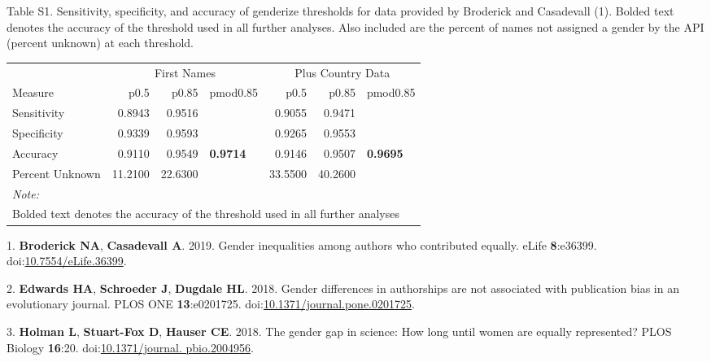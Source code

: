 \documentclass[11pt,]{article}
\begin{document}
\vspace{40mm}

Table S1. Sensitivity, specificity, and accuracy of genderize thresholds
for data provided by Broderick and Casadevall (1). Bolded text denotes
the accuracy of the threshold used in all further analyses. Also
included are the percent of names not assigned a gender by the API
(percent unknown) at each threshold.

\begin{table}[H]
\centering
\begin{tabular}{l|r|r|l|r|r|l}
\hline
\multicolumn{1}{c|}{ } & \multicolumn{3}{c|}{First Names} & \multicolumn{3}{c}{Plus Country Data} \\
\cline{2-4} \cline{5-7}
Measure & p0.5 & p0.85 & pmod0.85 & p0.5 & p0.85 & pmod0.85\\
\hline
Sensitivity & 0.8943 & 0.9516 & \cellcolor{white}{0.971} & 0.9055 & 0.9471 & \cellcolor{white}{0.9669}\\
\hline
Specificity & 0.9339 & 0.9593 & \cellcolor{white}{0.972} & 0.9265 & 0.9553 & \cellcolor{white}{0.9727}\\
\hline
Accuracy & 0.9110 & 0.9549 & \textbf{0.9714} & 0.9146 & 0.9507 & \textbf{0.9695}\\
\hline
Percent Unknown & 11.2100 & 22.6300 & \cellcolor{white}{34.58} & 33.5500 & 40.2600 & \cellcolor{white}{58.72}\\
\hline
\multicolumn{7}{l}{\textit{Note: }}\\
\multicolumn{7}{l}{Bolded text denotes the accuracy of the threshold used in all further analyses}\\
\end{tabular}
\end{table}

\hypertarget{refs}{}
\hypertarget{ref-broderick_gender_2019}{}
1. \textbf{Broderick NA}, \textbf{Casadevall A}. 2019. Gender
inequalities among authors who contributed equally. eLife
\textbf{8}:e36399.
doi:\href{https://doi.org/10.7554/eLife.36399}{10.7554/eLife.36399}.

\hypertarget{ref-edwards_gender_2018}{}
2. \textbf{Edwards HA}, \textbf{Schroeder J}, \textbf{Dugdale HL}. 2018.
Gender differences in authorships are not associated with publication
bias in an evolutionary journal. PLOS ONE \textbf{13}:e0201725.
doi:\href{https://doi.org/10.1371/journal.pone.0201725}{10.1371/journal.pone.0201725}.

\hypertarget{ref-holman_gender_2018}{}
3. \textbf{Holman L}, \textbf{Stuart-Fox D}, \textbf{Hauser CE}. 2018.
The gender gap in science: How long until women are equally represented?
PLOS Biology \textbf{16}:20.
doi:\href{https://doi.org/10.1371/journal.\%20pbio.2004956}{10.1371/journal. pbio.2004956}.
\end{document}
